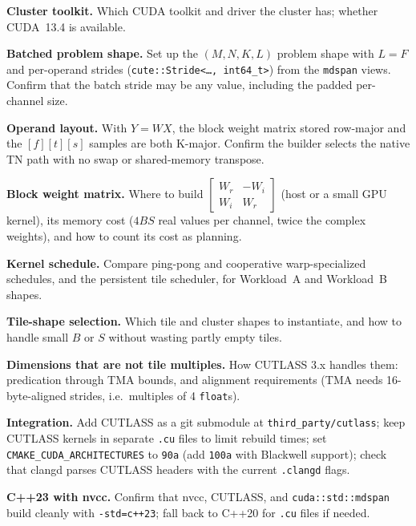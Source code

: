 \documentclass[10pt,letterpaper]{article}
\begin{document}
\begin{todo}
  \item \textbf{Cluster toolkit.} Which CUDA toolkit and driver the cluster has; whether CUDA~13.4 is available.
  \item \textbf{Batched problem shape.} Set up the $(M, N, K, L)$ problem shape with $L = F$ and per-operand strides (\texttt{cute::Stride<\ldots, int64\_t>}) from the \texttt{mdspan} views. Confirm that the batch stride may be any value, including the padded per-channel size.
  \item \textbf{Operand layout.} With $Y = W X$, the block weight matrix stored row-major and the $[f][t][s]$ samples are both K-major. Confirm the builder selects the native TN path with no swap or shared-memory transpose.
  \item \textbf{Block weight matrix.} Where to build $\left[\begin{smallmatrix} W_r & -W_i \\ W_i & W_r \end{smallmatrix}\right]$ (host or a small GPU kernel), its memory cost ($4BS$ real values per channel, twice the complex weights), and how to count its cost as planning.
  \item \textbf{Kernel schedule.} Compare ping-pong and cooperative warp-specialized schedules, and the persistent tile scheduler, for Workload~A and Workload~B shapes.
  \item \textbf{Tile-shape selection.} Which tile and cluster shapes to instantiate, and how to handle small $B$ or $S$ without wasting partly empty tiles.
  \item \textbf{Dimensions that are not tile multiples.} How CUTLASS 3.x handles them: predication through TMA bounds, and alignment requirements (TMA needs 16-byte-aligned strides, i.e.\ multiples of 4 \texttt{float}s).
  \item \textbf{Integration.} Add CUTLASS as a git submodule at \texttt{third\_party/cutlass}; keep CUTLASS kernels in separate \texttt{.cu} files to limit rebuild times; set \texttt{CMAKE\_CUDA\_ARCHITECTURES} to \texttt{90a} (add \texttt{100a} with Blackwell support); check that clangd parses CUTLASS headers with the current \texttt{.clangd} flags.
  \item \textbf{C++23 with nvcc.} Confirm that nvcc, CUTLASS, and \texttt{cuda::std::mdspan} build cleanly with \texttt{-std=c++23}; fall back to C++20 for \texttt{.cu} files if needed.
\end{todo}
\end{document}
